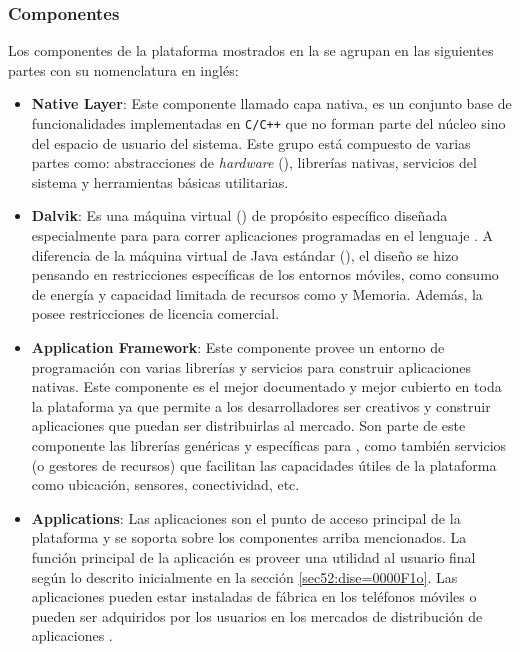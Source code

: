 \subsubsection{Componentes}

Los componentes de la plataforma mostrados en la 
se agrupan en las siguientes partes \cite{Gargenta2014} con su nomenclatura
en inglés:
\begin{itemize}
\item \textbf{Native Layer}: Este componente llamado capa nativa, es un
conjunto base de funcionalidades implementadas en \texttt{C/C++} que
no forman parte del núcleo sino del espacio de usuario del sistema.
Este grupo está compuesto de varias partes como: abstracciones de
\emph{hardware} (), librerías nativas, servicios del sistema
y herramientas básicas utilitarias.
\item \textbf{Dalvik}: Es una máquina virtual () de propósito
específico diseñada especialmente para  para correr
aplicaciones programadas en el lenguaje  \cite{Ehringer2010}.
A diferencia de la máquina virtual de Java estándar (),
el diseño se hizo pensando en restricciones específicas de los entornos
móviles, como consumo de energía y capacidad limitada de recursos
como  y Memoria. Además, la  posee restricciones
de licencia comercial.
\item \textbf{Application Framework}: Este componente provee un entorno
de programación con varias librerías y servicios para construir aplicaciones
nativas. Este componente es el mejor documentado y mejor cubierto
en toda la plataforma ya que permite a los desarrolladores ser creativos
y construir aplicaciones que puedan ser distribuirlas al mercado.
Son parte de este componente las librerías  genéricas
y específicas para  \cite{OHA2008r}, como también
servicios (o gestores de recursos) que facilitan las capacidades útiles
de la plataforma como ubicación, sensores, conectividad, etc. 
\item \textbf{Applications}: Las aplicaciones son el punto de acceso principal
de la plataforma y se soporta sobre los componentes arriba mencionados.
La función principal de la aplicación es proveer una utilidad al usuario
final según lo descrito inicialmente en la sección \ref{sec52:dise=0000F1o}.
Las aplicaciones pueden estar instaladas de fábrica en los teléfonos
móviles o pueden ser adquiridos por los usuarios en los mercados de
distribución de aplicaciones .
\end{itemize}

